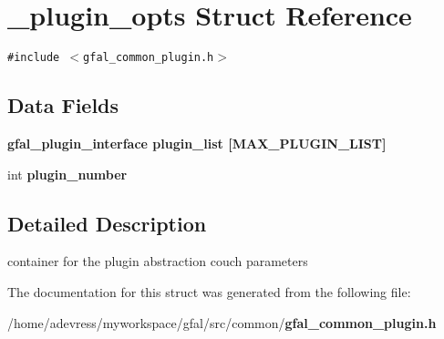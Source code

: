 \section{\_\-plugin\_\-opts Struct Reference}
\label{struct__plugin__opts}
{\tt \#include $<$gfal\_\-common\_\-plugin.h$>$}

\subsection*{Data Fields}
\begin{CompactItemize}
\item 
\bf{gfal\_\-plugin\_\-interface} \textbf{plugin\_\-list} [MAX\_\-PLUGIN\_\-LIST]\label{struct__plugin__opts_aaf10030de179e206f80df2becba58cd}

\item 
int \textbf{plugin\_\-number}\label{struct__plugin__opts_cd39252f5f48e6ba19ca2d2a3be04985}

\end{CompactItemize}


\subsection{Detailed Description}
container for the plugin abstraction couch parameters 



The documentation for this struct was generated from the following file:\begin{CompactItemize}
\item 
/home/adevress/myworkspace/gfal/src/common/\bf{gfal\_\-common\_\-plugin.h}\end{CompactItemize}
